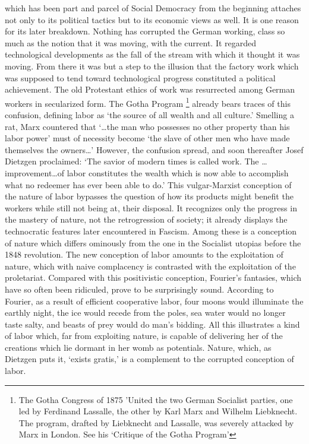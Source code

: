 \documentclass[12pt]{tufte-handout}
\begin{document}
 which has been part and parcel of Social Democracy from the beginning attaches not only to its political tactics but to its economic views as well. It is one reason for its later breakdown. Nothing has corrupted the German working, class so much as the notion that it was moving, with the current. It regarded technological developments as the fall of the stream with which it thought it was moving. From there it was but a step to the illusion that the factory work which was supposed to tend toward technological progress constituted a political achievement. The old Protestant ethics of work was resurrected among German workers in secularized form. The Gotha Program \footnote{The Gotha Congress of 1875 'United the two German Socialist parties, one led by Ferdinand Lassalle, the other by Karl Marx and Wilhelm Liebknecht. The program, drafted by Liebknecht and Lassalle, was severely attacked by Marx in London. See his `Critique of the Gotha Program'} already bears traces of this confusion, defining labor as `the source of all wealth and all culture.' Smelling a rat, Marx countered that `\ldots the man who possesses no other property than his labor power' must of necessity become `the slave of other men who have made themselves the owners\ldots' However, the confusion spread, and soon thereafter Josef Dietzgen proclaimed: `The savior of modern times is called work. The \ldots improvement\ldots of labor constitutes the wealth which is now able to accomplish what no redeemer has ever been able to do.' This vulgar-Marxist conception of the nature of labor bypasses the question of how its products might benefit the workers while still not being at, their disposal. It recognizes only the progress in the mastery of nature, not the retrogression of society; it already displays the technocratic features later encountered in Fascism. Among these is a conception of nature which differs ominously from the one in the Socialist utopias before the 1848 revolution. The new conception of labor amounts to the exploitation of nature, which with naive complacency is contrasted with the exploitation of the proletariat. Compared with this positivistic conception, Fourier's fantasies, which have so often been ridiculed, prove to be surprisingly sound. According to Fourier, as a result of efficient cooperative labor, four moons would illuminate the earthly night, the ice would recede from the poles, sea water would no longer taste salty, and beasts of prey would do man's bidding. All this illustrates a kind of labor which, far from exploiting nature, is capable of delivering her of the creations which lie dormant in her womb as potentials. Nature, which, as Dietzgen puts it, `exists gratis,' is a complement to the corrupted conception of labor.	 
 	 		
\end{document}
